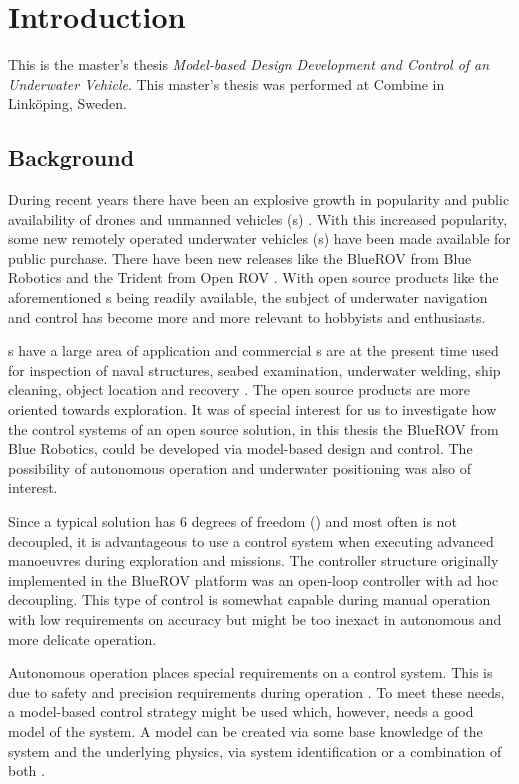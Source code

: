 \chapter{Introduction}\label{cha:intro}
This is the master's thesis \textit{Model-based Design Development and Control of an Underwater Vehicle}.
This master's thesis was performed at Combine in Linköping, Sweden.

\section{Background}
During recent years there have been an explosive growth in popularity and public availability of drones and unmanned vehicles (\abbrUV{}s) \citep{popmechanics}. With this increased popularity, some new remotely operated underwater vehicles (\abbrROV{}s) have been made available for public purchase. There have been new releases like the BlueROV from Blue Robotics \citep{bluerobotics} and the Trident from Open ROV \citep{openrov}. With open source products like the aforementioned \abbrROV{}s being readily available, the subject of underwater navigation and control has become more and more relevant to hobbyists and enthusiasts.

\abbrROV{}s have a large area of application and commercial \abbrROV{}s are at the present time used for inspection of naval structures, seabed examination, underwater welding, ship cleaning, object location and recovery \citep{saab}. The open source products are more oriented towards exploration. It was of special interest for us to investigate how the control systems of an open source \abbrROV solution, in this thesis the BlueROV from Blue Robotics, could be developed via model-based design and control. The possibility of autonomous operation and underwater positioning was also of interest.

Since a typical \abbrROV solution has 6 degrees of freedom (\abbrDOF) and most often is not decoupled, it is advantageous to use a control system when executing advanced manoeuvres during exploration and missions. The controller structure originally implemented in the BlueROV platform was an open-loop controller with ad hoc decoupling. This type of control is somewhat capable during manual operation with low requirements on accuracy but might be too inexact in autonomous and more delicate operation. 

Autonomous operation places special requirements on a control system. This is due to safety and precision requirements during operation \citep[p. 416]{safety}. To meet these needs, a model-based control strategy might be used which, however, needs a good model of the system. A model can be created via some base knowledge of the system and the underlying physics, via system identification or a combination of both \citep{modellbygge}. 

